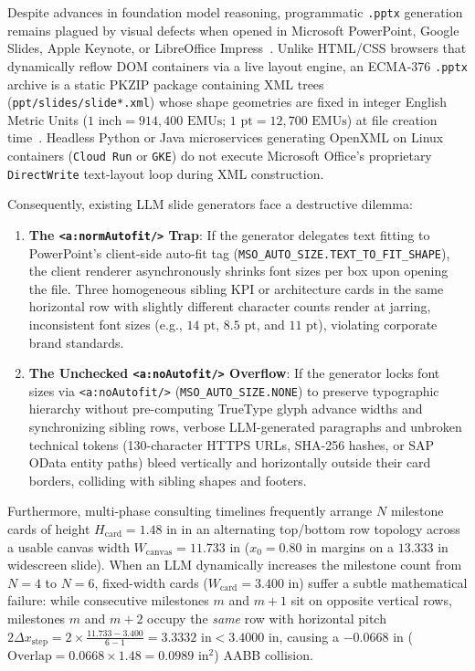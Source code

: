 \documentclass[10pt,journal,compsoc]{IEEEtran}
\begin{document}
Despite advances in foundation model reasoning, programmatic \texttt{.pptx} generation remains plagued by visual defects when opened in Microsoft PowerPoint, Google Slides, Apple Keynote, or LibreOffice Impress~\cite{guo2024pptc,zheng2025pptagent,zhang2025slideaudit}. Unlike HTML/CSS browsers that dynamically reflow DOM containers via a live layout engine, an ECMA-376 \texttt{.pptx} archive is a static PKZIP package containing XML trees (\texttt{ppt/slides/slide*.xml}) whose shape geometries are fixed in integer English Metric Units ($1\text{ inch} = 914{,}400\text{ EMUs}$; $1\text{ pt} = 12{,}700\text{ EMUs}$) at file creation time~\cite{ecma376,pythonpptx}. Headless Python or Java microservices generating OpenXML on Linux containers (\texttt{Cloud Run} or \texttt{GKE}) do not execute Microsoft Office's proprietary \texttt{DirectWrite} text-layout loop during XML construction.

Consequently, existing LLM slide generators face a destructive dilemma:
\begin{enumerate}
    \item \textbf{The \texttt{<a:normAutofit/>} Trap}: If the generator delegates text fitting to PowerPoint's client-side auto-fit tag (\texttt{MSO\_AUTO\_SIZE.TEXT\_TO\_FIT\_SHAPE}), the client renderer asynchronously shrinks font sizes per box upon opening the file. Three homogeneous sibling KPI or architecture cards in the same horizontal row with slightly different character counts render at jarring, inconsistent font sizes (e.g., $14\text{ pt}$, $8.5\text{ pt}$, and $11\text{ pt}$), violating corporate brand standards.
    \item \textbf{The Unchecked \texttt{<a:noAutofit/>} Overflow}: If the generator locks font sizes via \texttt{<a:noAutofit/>} (\texttt{MSO\_AUTO\_SIZE.NONE}) to preserve typographic hierarchy without pre-computing TrueType glyph advance widths and synchronizing sibling rows, verbose LLM-generated paragraphs and unbroken technical tokens (130-character HTTPS URLs, SHA-256 hashes, or SAP OData entity paths) bleed vertically and horizontally outside their card borders, colliding with sibling shapes and footers.
\end{enumerate}

Furthermore, multi-phase consulting timelines frequently arrange $N$ milestone cards of height $H_{\text{card}} = 1.48\text{ in}$ in an alternating top/bottom row topology across a usable canvas width $W_{\text{canvas}} = 11.733\text{ in}$ ($x_0 = 0.80\text{ in}$ margins on a $13.333\text{ in}$ widescreen slide). When an LLM dynamically increases the milestone count from $N=4$ to $N=6$, fixed-width cards ($W_{\text{card}} = 3.400\text{ in}$) suffer a subtle mathematical failure: while consecutive milestones $m$ and $m+1$ sit on opposite vertical rows, milestones $m$ and $m+2$ occupy the \emph{same} row with horizontal pitch $2\Delta x_{\text{step}} = 2 \times \frac{11.733 - 3.400}{6 - 1} = 3.3332\text{ in} < 3.4000\text{ in}$, causing a $-0.0668\text{ in}$ ($\text{Overlap} = 0.0668 \times 1.48 = 0.0989\text{ in}^2$) AABB collision.
\end{document}
